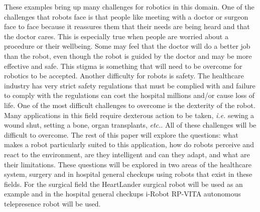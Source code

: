 \documentclass[11pt,conference]{IEEEtran}
\begin{document}
\newline
\indent These examples bring up many challenges for robotics in this domain. One of the challenges that robots face is that people like meeting with a doctor or surgeon face to face because it reassures them that their needs are being heard and that the doctor cares.  This is especially true when people are worried about a procedure or their wellbeing.  Some may feel that the doctor will do a better job than the robot, even though the robot is guided by the doctor and may be more effective and safe.  This stigma is something that will need to be 
overcome for robotics to be accepted.  Another difficulty for robots is safety.  The healthcare industry has very strict safety regulations that must be complied with and failure to comply with the regulations can cost the hospital millions and/or cause loss of life.  One of the most difficult challenges to overcome is the dexterity of the robot.  Many applications in this field require dexterous action to be taken, \textit{i.e.} sewing a wound shut, setting a bone, organ transplants, \textit{etc.}.  All of these challenges will be difficult to overcome. 
\newline
\indent The rest of this paper will explore the questions: what makes a robot particularly suited to this application, how do robots perceive and react to the environment, are they intelligent and can they adapt, and what are their limitations.  These questions will be explored in two areas of the healthcare system, surgery and in hospital general checkups using robots that exist in these fields.  For the surgical field the HeartLander surgical robot will be used as an example and in the hospital general checkups i-Robot RP-VITA autonomous telepresence robot will be used. 
\end{document}
